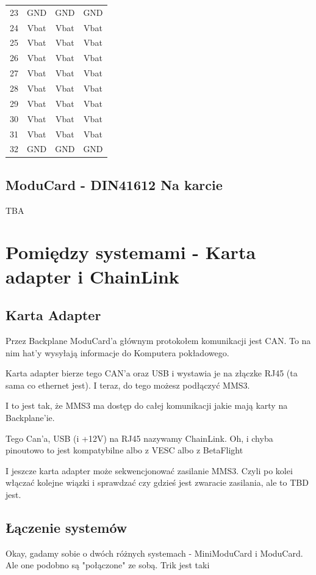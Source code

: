 \documentclass[b5paper, 10pt, twoside]{book}
\begin{document}
\begin{table}[H]
\begin{tabular}{@{}cccc@{}}
    23 & GND        & GND        & GND        \\
    24 & Vbat       & Vbat       & Vbat       \\
    25 & Vbat       & Vbat       & Vbat       \\
    26 & Vbat       & Vbat       & Vbat       \\
    27 & Vbat       & Vbat       & Vbat       \\
    28 & Vbat       & Vbat       & Vbat       \\
    29 & Vbat       & Vbat       & Vbat       \\
    30 & Vbat       & Vbat       & Vbat       \\
    31 & Vbat       & Vbat       & Vbat       \\
    32 & GND        & GND        & GND        \\ \bottomrule
  \end{tabular}
\end{table}


\subsection{ModuCard - DIN41612 Na karcie}
TBA

\section{Pomiędzy systemami - Karta adapter i ChainLink} \label{karta_adapter}
\subsection{Karta Adapter}
Przez Backplane ModuCard'a głównym protokołem komunikacji jest CAN. To na nim hat'y wysyłają informacje do Komputera pokładowego.

Karta adapter bierze tego CAN'a oraz USB i wystawia je na złączke RJ45 (ta sama co ethernet jest). I teraz, do tego możesz podłączyć MMS3.

I to jest tak, że MMS3 ma dostęp do całej komunikacji jakie mają karty na Backplane'ie.

Tego Can'a, USB (i +12V) na RJ45 nazywamy ChainLink. Oh, i chyba pinoutowo to jest kompatybilne albo z VESC albo z BetaFlight

I jeszcze karta adapter może sekwencjonować zasilanie MMS3. Czyli po kolei włączać kolejne wiązki i sprawdzać czy gdzieś jest zwaracie zasilania, ale to TBD jest.

\subsection{Łączenie systemów}
Okay, gadamy sobie o dwóch różnych systemach - MiniModuCard i ModuCard. Ale one podobno są "połączone" ze sobą. Trik jest taki
\end{document}
